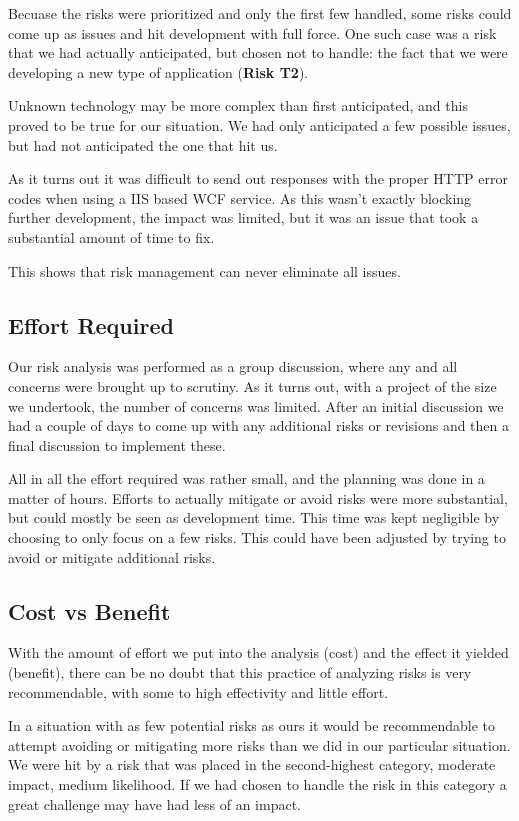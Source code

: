 Becuase the risks were prioritized and only the first few handled, some risks could come up as issues and
hit development with full force. One such case was a risk that we had actually anticipated, but chosen
not to handle: the fact that we were developing a new type of application (\textbf{Risk T2}).

Unknown technology may be more complex than first anticipated, and this proved to be true for our situation.
We had only anticipated a few possible issues, but had not anticipated the one that hit us.

As it turns out it was difficult to send out responses with the proper HTTP error codes when using a IIS based
WCF service. As this wasn't exactly blocking further development, the impact was limited, but it was an issue
that took a substantial amount of time to fix.

This shows that risk management can never eliminate all issues.

\subsection{Effort Required}

Our risk analysis was performed as a group discussion, where any and all concerns were brought up to scrutiny.
As it turns out, with a project of the size we undertook, the number of concerns was limited. After an initial
discussion we had a couple of days to come up with any additional risks or revisions and then a final discussion
to implement these.

All in all the effort required was rather small, and the planning was done in a matter of hours. Efforts to actually
mitigate or avoid risks were more substantial, but could mostly be seen as development time. This time was kept
negligible by choosing to only focus on a few risks. This could have been adjusted by trying to avoid or mitigate
additional risks.

\subsection{Cost vs Benefit}

With the amount of effort we put into the analysis (cost) and the effect it yielded (benefit), there can be no doubt
that this practice of analyzing risks is very recommendable, with some to high effectivity and little effort.

In a situation with as few potential risks as ours it would be recommendable to attempt avoiding or mitigating more
risks than we did in our particular situation. We were hit by a risk that was placed in the second-highest category,
moderate impact, medium likelihood. If we had chosen to handle the risk in this category a great challenge may have
had less of an impact.